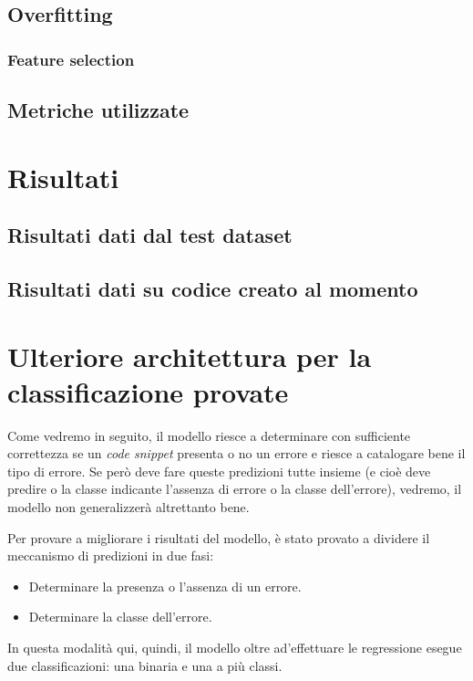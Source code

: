 \subsection{Overfitting}\label{subsec:overfitting}
    \subsubsection{Feature selection}
\subsection{Metriche utilizzate}\label{subsec:metriche}

\section{Risultati}
\subsection{Risultati dati dal test dataset}
\subsection{Risultati dati su codice creato al momento}



\section{Ulteriore architettura per la classificazione provate}
Come vedremo in seguito, il modello riesce a determinare con sufficiente correttezza se un \textit{code snippet} presenta o no un errore e riesce a catalogare bene il tipo di errore.
Se però deve fare queste predizioni tutte insieme (e cioè deve predire o la classe indicante l'assenza di errore o la classe dell'errore), vedremo, il modello non generalizzerà altrettanto bene.

Per provare a migliorare i risultati del modello, è stato provato a dividere il meccanismo di predizioni in due fasi:
    \begin{itemize}
        \item Determinare la presenza o l'assenza di un errore.
        \item Determinare la classe dell'errore.
    \end{itemize}
In questa modalità qui, quindi, il modello oltre ad'effettuare le regressione esegue due classificazioni: una binaria e una a più classi.

